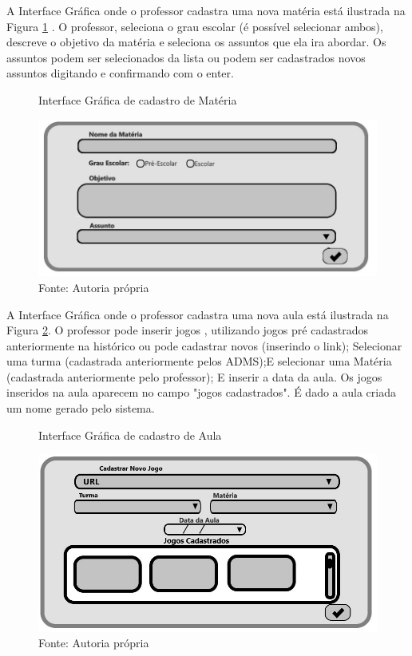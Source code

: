 \documentclass{utfpr-pg}
\begin{document}
    A Interface Gráfica onde o professor cadastra uma nova matéria está ilustrada na Figura \ref{fig:7} . O professor, seleciona o grau escolar (é possível selecionar ambos), descreve o objetivo da matéria e seleciona os assuntos que ela ira abordar. Os assuntos podem ser selecionados da lista ou podem ser cadastrados novos assuntos digitando e confirmando com o enter. 
       
        \begin{figure}[H]
            \centering
            \captionsetup{width=0.9\textwidth}
            \caption{Interface Gráfica de cadastro de Matéria}
            \includegraphics[width=\linewidth]{fotos/7.jpg}
            \caption*{Fonte: Autoria própria}
            \label{fig:7}
        \end{figure}
    
    A Interface Gráfica onde o professor cadastra uma nova aula está ilustrada na Figura \ref{fig:8}. O professor pode inserir jogos , utilizando jogos pré cadastrados anteriormente na histórico ou pode cadastrar novos (inserindo o link); Selecionar uma turma (cadastrada anteriormente pelos ADMS);E selecionar uma Matéria (cadastrada anteriormente pelo professor); E inserir a data da aula. Os jogos inseridos na aula aparecem no campo "jogos cadastrados". É dado a aula criada um nome gerado pelo sistema.
      \begin{figure}[H]
            \centering
            \captionsetup{width=0.9\textwidth}
            \caption{Interface Gráfica de cadastro de Aula}
            \includegraphics[width=\linewidth]{fotos/8.jpg}
            \caption*{Fonte: Autoria própria}
            \label{fig:8}
        \end{figure}
        
\end{document}
